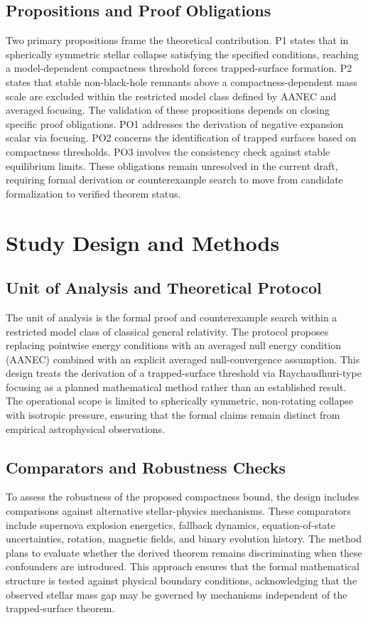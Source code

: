 \documentclass[conference]{IEEEtran}
\begin{document}
\subsection{Propositions and Proof Obligations}
Two primary propositions frame the theoretical contribution. P1 states that in spherically symmetric stellar collapse satisfying the specified conditions, reaching a model-dependent compactness threshold forces trapped-surface formation. P2 states that stable non-black-hole remnants above a compactness-dependent mass scale are excluded within the restricted model class defined by AANEC and averaged focusing. The validation of these propositions depends on closing specific proof obligations. PO1 addresses the derivation of negative expansion scalar via focusing. PO2 concerns the identification of trapped surfaces based on compactness thresholds. PO3 involves the consistency check against stable equilibrium limits. These obligations remain unresolved in the current draft, requiring formal derivation or counterexample search to move from candidate formalization to verified theorem status.

\section{Study Design and Methods}
\subsection{Unit of Analysis and Theoretical Protocol}
The unit of analysis is the formal proof and counterexample search within a restricted model class of classical general relativity. The protocol proposes replacing pointwise energy conditions with an averaged null energy condition (AANEC) combined with an explicit averaged null-convergence assumption. This design treats the derivation of a trapped-surface threshold via Raychaudhuri-type focusing as a planned mathematical method rather than an established result. The operational scope is limited to spherically symmetric, non-rotating collapse with isotropic pressure, ensuring that the formal claims remain distinct from empirical astrophysical observations.

\subsection{Comparators and Robustness Checks}
To assess the robustness of the proposed compactness bound, the design includes comparisons against alternative stellar-physics mechanisms. These comparators include supernova explosion energetics, fallback dynamics, equation-of-state uncertainties, rotation, magnetic fields, and binary evolution history. The method plans to evaluate whether the derived theorem remains discriminating when these confounders are introduced. This approach ensures that the formal mathematical structure is tested against physical boundary conditions, acknowledging that the observed stellar mass gap may be governed by mechanisms independent of the trapped-surface theorem.
\end{document}
